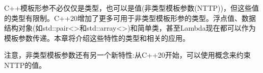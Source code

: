 C++模板形参不必仅仅是类型，也可以是值(非类型模板参数(NTTP))，但这些值的类型有限制。C++20增加了更多可用于非类型模板形参的类型。浮点值、数据结构对象(如std::pair<>和std::array<>)和简单类，甚至Lambda现在都可以作为模板参数传递。本章将介绍这些特性的类型和相关的应用。

注意，非类型模板参数还有另一个新特性:从C++20开始，可以使用概念来约束NTTP的值。